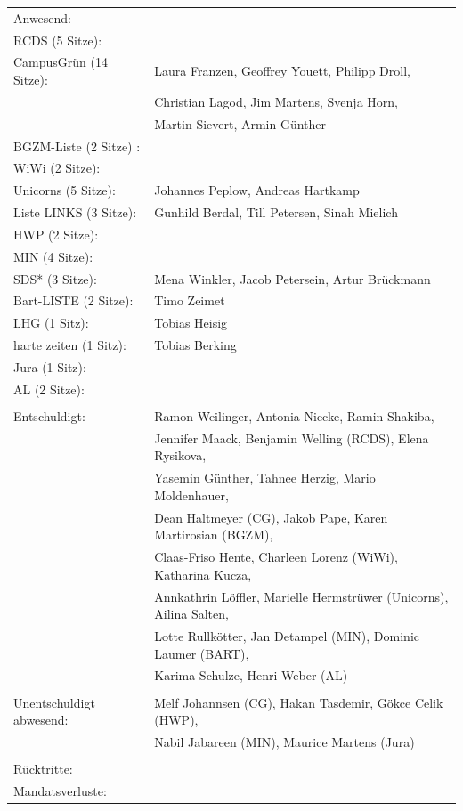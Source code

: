 \documentclass[ngerman,headheight=70pt]{scrartcl}
\begin{document}
    \begin{tabular}{ll}
        Anwesend: & \\
            RCDS (5 Sitze): &  \\
             CampusGrün (14 Sitze): & Laura Franzen, Geoffrey Youett, Philipp Droll, \\
                                   & Christian Lagod, Jim Martens, Svenja Horn, \\
                                   & Martin Sievert, Armin Günther \\
             BGZM-Liste (2 Sitze) : & \\
             WiWi (2 Sitze): & \\
             Unicorns (5 Sitze): &  Johannes Peplow, Andreas Hartkamp \\
             Liste LINKS (3 Sitze): & Gunhild Berdal, Till Petersen, Sinah Mielich \\
             HWP (2 Sitze): &  \\
             MIN (4 Sitze): &  \\
             SDS* (3 Sitze): & Mena Winkler, Jacob Petersein, Artur Brückmann \\
             Bart-LISTE (2 Sitze): & Timo Zeimet \\
             LHG (1 Sitz): & Tobias Heisig \\
             harte zeiten (1 Sitz): & Tobias Berking \\
             Jura (1 Sitz): & \\
             AL (2 Sitze): &  \\
            & \\
        Entschuldigt: & Ramon Weilinger, Antonia Niecke, Ramin Shakiba, \\
                      & Jennifer Maack, Benjamin Welling (RCDS), Elena Rysikova, \\
                      & Yasemin Günther, Tahnee Herzig, Mario Moldenhauer, \\
                      & Dean Haltmeyer (CG), Jakob Pape, Karen Martirosian (BGZM), \\
                      & Claas-Friso Hente, Charleen Lorenz (WiWi), Katharina Kucza, \\
                      & Annkathrin Löffler, Marielle Hermstrüwer (Unicorns), Ailina Salten,\\
                      & Lotte Rullkötter, Jan Detampel (MIN), Dominic Laumer (BART), \\
                      & Karima Schulze, Henri Weber (AL)\\
                      &\\
        Unentschuldigt abwesend: & Melf Johannsen (CG), Hakan Tasdemir, Gökce Celik (HWP),\\
                                & Nabil Jabareen (MIN), Maurice Martens (Jura) \\
                                &\\
        Rücktritte: & \\
        Mandatsverluste: & \\
    \end{tabular}
\end{document}
